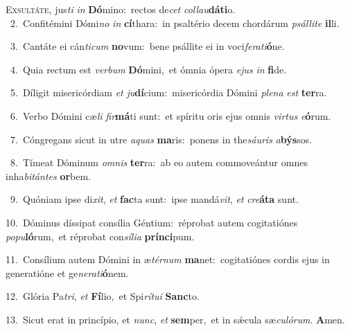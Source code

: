 \lettrine{\initial\textcolor{\initialcolor}{E}}{xsultáte,} jus\textit{ti} \textit{in} \textbf{Dó}\-mino:~\star rectos de\textit{cet} \textit{col}\-\textit{lau}\textbf{dá}\textbf{ti}o.\\
{\numbfont\textcolor{\numbcolor}{~2.}}~Confitémini Dómi\textit{no} \textit{in} \textbf{cí}\-thara:~\star in psaltério decem chordárum \textit{psál}\-\textit{li}\textit{te} \textbf{il}\-li.\par
{\numbfont\textcolor{\numbcolor}{~3.}}~Cantáte ei cán\-\textit{ti}\-\textit{cum} \textbf{no}\-vum:~\star bene psállite ei in voci\-\textit{fe}\-\textit{ra}\textit{ti}\textbf{ó}ne.\par
{\numbfont\textcolor{\numbcolor}{~4.}}~Quia rectum est \textit{ver}\-\textit{bum} \textbf{Dó}\-mini,~\star et ómnia ópera \textit{e}\-\textit{jus} \textit{in} \textbf{fi}\-de.\par
{\numbfont\textcolor{\numbcolor}{~5.}}~Díligit misericórdiam \textit{et} \textit{ju}\-\textbf{dí}cium:~\star misericórdia Dómini \textit{ple}\-\textit{na} \textit{est} \textbf{ter}\-ra.\par
{\numbfont\textcolor{\numbcolor}{~6.}}~Verbo Dómini cæ\textit{li} \textit{fir}\-\textbf{má}ti sunt:~\star et spíritu oris ejus omnis \textit{vir}\-\textit{tus} \textit{e}\-\textbf{ó}rum.\par
{\numbfont\textcolor{\numbcolor}{~7.}}~Cóngregans sicut in utre \textit{a}\-\textit{quas} \textbf{ma}\-ris:~\star ponens in the\-\textit{sáu}\-\textit{ris} \textit{a}\-\textbf{býs}sos.\par
{\numbfont\textcolor{\numbcolor}{~8.}}~Tímeat Dóminum \textit{om}\-\textit{nis} \textbf{ter}\-ra:~\star ab eo autem commoveántur omnes inha\-\textit{bi}\-\textit{tán}\textit{tes} \textbf{or}\-bem.\par
{\numbfont\textcolor{\numbcolor}{~9.}}~Quóniam ipse di\-\textit{xit}\-, \textit{et} \textbf{fac}\-ta sunt:~\star ipse mandá\-\textit{vit}\-, \textit{et} \textit{cre}\-\textbf{á}\textbf{ta} sunt.\par
{\numbfont\textcolor{\numbcolor}{10.}}~Dóminus díssipat consília Géntium:~\dagger réprobat autem cogitatiónes \textit{po}\-\textit{pu}\textbf{ló}rum,~\star et réprobat con\-\textit{sí}\-\textit{li}\textit{a} \textbf{prín}\-\textbf{ci}pum.\par
{\numbfont\textcolor{\numbcolor}{11.}}~Consílium autem Dómini in æ\-\textit{tér}\-\textit{num} \textbf{ma}\-net:~\star cogitatiónes cordis ejus in generatióne et ge\-\textit{ne}\-\textit{ra}\textit{ti}\textbf{ó}nem.\par
{\numbfont\textcolor{\numbcolor}{12.}}~Glória Pa\-\textit{tri}\-, \textit{et} \textbf{Fí}\-lio,~\star et Spi\-\textit{rí}\-\textit{tu}\textit{i} \textbf{Sanc}\-to.\par
{\numbfont\textcolor{\numbcolor}{13.}}~Sicut erat in princípio, et \textit{nunc}\-, \textit{et} \textbf{sem}\-per,~\star et in sǽcula sæ\-\textit{cu}\-\textit{ló}\textit{rum}. \textbf{A}\-men.\par
